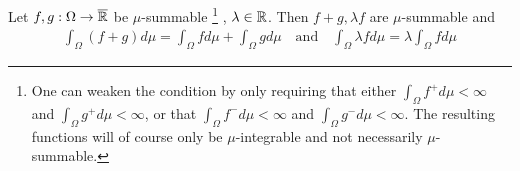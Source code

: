 \begin{thm}[] \label{thm:linearity-integral}
  Let $f,g: \Omega\to \overline{\mathbb{R}}$ be $\mu$-summable
  \footnote{
    One can weaken the condition by only requiring that either 
    $\int_{\Omega} f^{+} d \mu < \infty$ 
    and $\int_{\Omega} g^{+} d \mu< \infty$, 
    or that $\int_{\Omega} f^{-} d \mu < \infty$
    and $\int_{\Omega} g^{-} d \mu < \infty$.
    The resulting functions will of course only be $\mu$-integrable and not necessarily $\mu$-summable.
  }
  , $\lambda \in \mathbb{R}$.
  Then $f+g, \lambda f$ are $\mu$-summable and
  \begin{align*}
    \int_{\Omega}(f + g) d \mu 
    =
    \int_{\Omega} f d \mu + \int_{\Omega} g d \mu \quad \text{and} \quad 
    \int_{\Omega} \lambda f d \mu
    =
    \lambda \int_{\Omega} f d \mu
  \end{align*}
\end{thm}
